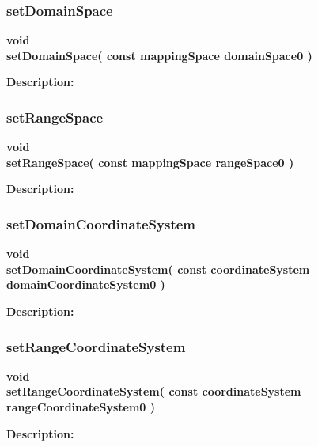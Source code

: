 \subsubsection{setDomainSpace}
 
\begin{flushleft} \textbf{%
void  \\ 
\settowidth{\MappingIncludeArgIndent}{setDomainSpace(}%
setDomainSpace( const mappingSpace domainSpace0 )
}\end{flushleft}
\begin{description}
\item[{\bf Description:}] 
\end{description}
\subsubsection{setRangeSpace}
 
\begin{flushleft} \textbf{%
void  \\ 
\settowidth{\MappingIncludeArgIndent}{setRangeSpace(}%
setRangeSpace( const mappingSpace rangeSpace0 )
}\end{flushleft}
\begin{description}
\item[{\bf Description:}] 
\end{description}
\subsubsection{setDomainCoordinateSystem}
 
\begin{flushleft} \textbf{%
void  \\ 
\settowidth{\MappingIncludeArgIndent}{setDomainCoordinateSystem(}%
setDomainCoordinateSystem( const coordinateSystem domainCoordinateSystem0 )
}\end{flushleft}
\begin{description}
\item[{\bf Description:}] 
\end{description}
\subsubsection{setRangeCoordinateSystem}
 
\begin{flushleft} \textbf{%
void  \\ 
\settowidth{\MappingIncludeArgIndent}{setRangeCoordinateSystem(}%
setRangeCoordinateSystem( const coordinateSystem rangeCoordinateSystem0 )
}\end{flushleft}
\begin{description}
\item[{\bf Description:}] 
\end{description}
